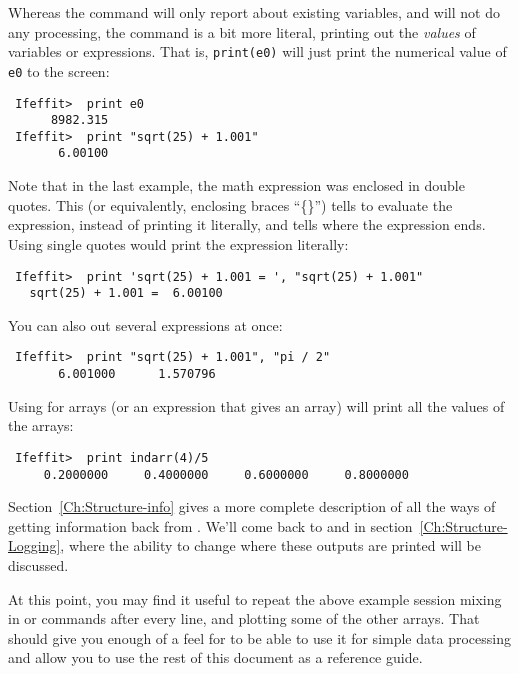 Whereas the {} command will only report about existing variables,
and will not do any processing, the {} command is a bit more
literal, printing out the {\emph{values}} of variables or expressions.
That is, {\tt{print(e0)}} will just print the numerical value of {\tt{e0}}
to the screen:
\begin{verbatim}
 Ifeffit>  print e0
      8982.315
 Ifeffit>  print "sqrt(25) + 1.001"
       6.00100
\end{verbatim}\noindent
Note that in the last example, the math expression was enclosed in double
quotes.  This (or equivalently, enclosing braces ``\{\}'') tells {\ifeffit}
to evaluate the expression, instead of printing it literally, and tells
{\ifeffit} where the expression ends.  Using single quotes would print
the expression literally:
\begin{verbatim}
 Ifeffit>  print 'sqrt(25) + 1.001 = ', "sqrt(25) + 1.001"
   sqrt(25) + 1.001 =  6.00100
\end{verbatim}\noindent
You can also {} out several expressions at once:
\begin{verbatim}
 Ifeffit>  print "sqrt(25) + 1.001", "pi / 2"
       6.001000      1.570796  
\end{verbatim}\noindent
Using {} for arrays (or an expression that gives an array) will
print all the values of the arrays:
\begin{verbatim}
 Ifeffit>  print indarr(4)/5
     0.2000000     0.4000000     0.6000000     0.8000000  
\end{verbatim}

Section~{\ref{Ch:Structure-info}} gives a more complete description of all
the ways of getting information back from {\ifeffit}.  We'll come back to
{} and {} in section~{\ref{Ch:Structure-Logging}},
where the ability to change where these outputs are printed will be
discussed.

At this point, you may find it useful to repeat the above example session
mixing in {} or {} commands after every line, and
plotting some of the other arrays.  That should give you enough of a feel
for {\ifeffit} to be able to use it for simple data processing and allow
you to use the rest of this document as a reference guide.
